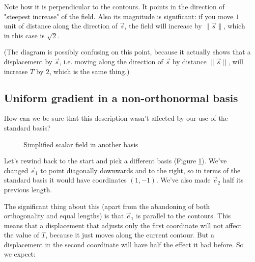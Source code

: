 Note how it is perpendicular to the contours. It points in the direction of "steepest increase" of the field. Also its magnitude is significant: if you move $1$ unit of distance along the direction of $\vec{s}$, the field will increase by $\|\vec{s}\|$, which in this case is $\sqrt{2}$.

(The diagram is possibly confusing on this point, because it actually shows that a displacement by $\vec{s}$, i.e. moving along the direction of $\vec{s}$ by distance $\|\vec{s}\|$, will increase $T$ by $2$, which is the same thing.)

\subsection{Uniform gradient in a non-orthonormal basis}

How can we be sure that this description wasn't affected by our use of the standard basis?

\begin{figure}[h]
    \caption{Simplified scalar field in another basis}
    \centering
    \label{fig:scalar-field-awkward-basis}
\end{figure}

Let's rewind back to the start and pick a different basis (Figure \ref{fig:scalar-field-awkward-basis}). We've changed $\vec{e}_1$ to point diagonally downwards and to the right, so in terms of the standard basis it would have coordinates $(1, -1)$. We've also made $\vec{e}_2$ half its previous length.

The significant thing about this (apart from the abandoning of both orthogonality and equal lengths) is that $\vec{e}_1$ is parallel to the contours. This means that a displacement that adjusts only the first coordinate will not affect the value of $T$, because it just moves along the current contour. But a displacement in the second coordinate will have half the effect it had before. So we expect:

